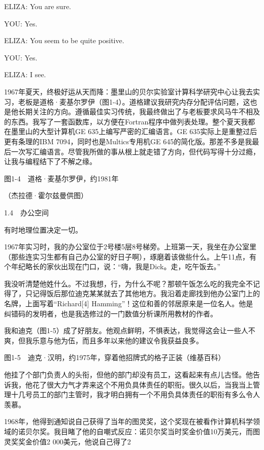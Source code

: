 \documentclass[a4paper,12pt,UTF8,twoside]{ctexbook}
\begin{document}
ELIZA: You are sure.

YOU: Yes.

ELIZA: You seem to be quite positive.

YOU: Yes.

ELIZA: I see.

1967年夏天，终极好运从天而降：墨里山的贝尔实验室计算科学研究中心让我去实习，老板是道格·麦基尔罗伊（图1-4）。道格建议我研究内存分配评估问题，这也是他长期关注的方向。遵循最佳实习传统，我最终做出了与老板要求风马牛不相及的东西。我写了一套函数库，以方便在Fortran程序中做列表处理。整个夏天我都在墨里山的大型计算机GE 635上编写严密的汇编语言。GE 635实际上是重整过后更有条理的IBM 7094，同时也是Multics专用机GE 645的简化版。那差不多是我最后一次写汇编语言。尽管我所做的事从根上就走错了方向，但代码写得十分过瘾，让我与编程结下了不解之缘。



图1-4　道格·麦基尔罗伊，约1981年

（杰拉德·霍尔兹曼供图）





1.4　办公空间


有时地理位置决定一切。

1967年实习时，我的办公室位于2号楼5层8号梯旁。上班第一天，我坐在办公室里（那些连实习生都有自己办公室的好日子啊），琢磨着该做些什么。上午11点，有个年纪略长的家伙出现在门口，说：“嗨，我是Dick。走，吃午饭去。”

我没听清楚他姓什么。不过我想，行，为什么不呢？那顿午饭怎么吃的我完全不记得了，只记得饭后那位迪克某某就去了其他地方。我沿着走廊找到他办公室门上的名牌，上面写着“Richard[4] Hamming”！这位和善的邻居原来是一位名人。他是纠错码的发明者，也是我选修过的一门数值分析课所用教材的作者。

我和迪克（图1-5）成了好朋友。他观点鲜明，不惧表达，我觉得这会让一些人不爽，但我乐意与他为伍，而且多年以来他的建议令我获益良多。



图1-5　迪克·汉明，约1975年，穿着他招牌式的格子正装（维基百科）

他挂了个部门负责人的头衔，但他的部门却没有员工，这看起来有点儿古怪。他告诉我，他花了很大力气才弄来这个不用负具体责任的职衔。很久以后，当我当上管理十几号员工的部门主管时，我才明白拥有一个不用负具体责任的职衔有多么令人羡慕。

1968年，他得到通知说自己获得了当年的图灵奖，这个奖现在被看作计算机科学领域的诺贝尔奖。我目睹了他的自嘲式反应：诺贝尔奖当时奖金价值10万美元，而图灵奖奖金价值2 000美元，他说自己得了2%
\end{document}
